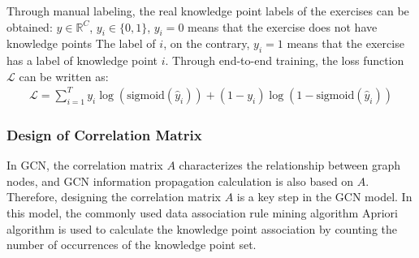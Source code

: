 Through manual labeling, the real knowledge point labels of the exercises can be obtained: \(y\in \mathbb{R}^C\), \(y_i\in \{0,1\} \), \(y_i=0\) means that the exercise does not have knowledge points The label of \(i\), on the contrary, \(y_i=1\) means that the exercise has a label of knowledge point \(i\). Through end-to-end training, the loss function \(\mathcal{L}\) can be written as:
\begin{align}
	\mathcal{L}=\sum_{i=1}^{T} y_i \log (\text{sigmoid}(\hat{y}_i))+(1-y_i) \log (1-\text{sigmoid}(\hat{y}_i))
\end{align}

\subsubsection{Design of Correlation Matrix}


In GCN, the correlation matrix \(A\) characterizes the relationship between graph nodes, and GCN information propagation calculation is also based on \(A\). Therefore, designing the correlation matrix \(A\) is a key step in the GCN model. In this model, the commonly used data association rule mining algorithm Apriori algorithm is used to calculate the knowledge point association by counting the number of occurrences of the knowledge point set.

